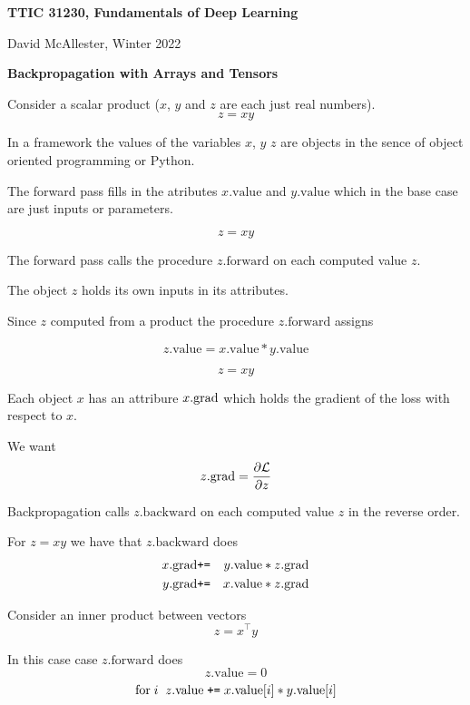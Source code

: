 




{\Huge
  
  \centerline{\bf TTIC 31230, Fundamentals of Deep Learning}
  \bigskip
  \centerline{David McAllester, Winter 2022}
  \vfill
  \vfill
  \centerline{\bf Backpropagation with Arrays and Tensors}
  \vfill
  \vfill


Consider a scalar product ($x$, $y$ and $z$ are each just real numbers).
$$z = xy$$

\vfill
In a framework the values of the variables $x$, $y$ $z$ are objects in the sence of object oriented programming or Python.

\vfill
The forward pass fills in the atributes $x.\mathrm{value}$ and $y.\mathrm{value}$ which in the base case are just inputs or parameters.

$$z = xy$$

\vfill
The forward pass calls the procedure $z.\mathrm{forward}$ on each computed value $z$.

\vfill
The object $z$ holds its own inputs in its attributes.

\vfill
Since $z$ computed from a product the procedure $z.\mathrm{forward}$ assigns

\vfill
$$z.\mathrm{value} = x.\mathrm{value}*y.\mathrm{value}$$

$$z = xy$$

\vfill
Each object $x$ has an attribure $x.\mathrm{grad}$ which holds the gradient of the loss with respect to $x$.

We want
$$z.\mathrm{grad} = \frac{\partial {\cal L}}{\partial z}$$

\vfill
Backpropagation calls $z.\mathrm{backward}$ on each computed value $z$ in the reverse order.

\vfill
For $z = xy$ we have that $z.\mathrm{backward}$ does
\begin{eqnarray*}
x.\mathrm{grad} & \mbox{\tt +=} & y.\mathrm{value}*z.\mathrm{grad} \\
y.\mathrm{grad} & \mbox{\tt +=} & x.\mathrm{value}* z.\mathrm{grad}
\end{eqnarray*}

Consider an inner product between vectors
$$z = x^\top y$$

\vfill
In this case case $z.\mathrm{forward}$ does
$$z.\mathrm{value} = 0$$
$$\mathrm{for}\;i\;\;z.\mathrm{value} \;\mbox{\tt +=}\;x.\mathrm{value}[i]*y.\mathrm{value}[i]$$

}
